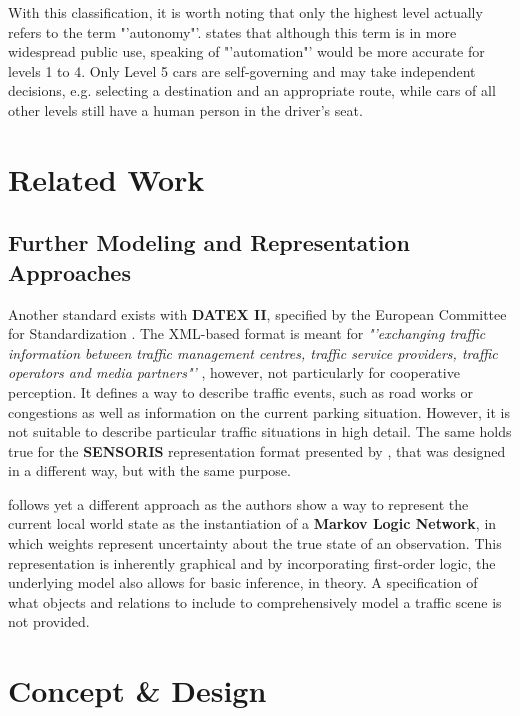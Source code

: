 With this classification, it is worth noting that only the highest level actually refers to the term "'autonomy"'. \cite{wood2012potential} states that although this term is in more widespread public use, speaking of "'automation"' would be more accurate for levels 1 to 4. Only Level 5 cars are self-governing and may take independent decisions, e.g. selecting a destination and an appropriate route, while cars of all other levels still have a human person in the driver's seat.

\section{Related Work}
\label{sec:appendix:texts:related_work}

\subsection{Further Modeling and Representation Approaches}
\label{subsec:appendix:texts:related_work:state_represtation}
Another standard exists with \textbf{DATEX II}, specified by the European Committee for Standardization \cite{Dolger2011}. The XML-based format is meant for \textit{"'exchanging traffic information between traffic management centres, traffic service providers, traffic operators and media partners"'} \cite{wiki:datex2}, however, not particularly for cooperative perception. It defines a way to describe traffic events, such as road works or congestions as well as information on the current parking situation. However, it is not suitable to describe particular traffic situations in high detail. The same holds true for the \textbf{SENSORIS} representation format presented by \cite{Hohm2019}, that was designed in a different way, but with the same purpose.
\par
\medskip

\cite{Stiller2012} follows yet a different approach as the authors show a way to represent the current local world state as the instantiation of a \textbf{Markov Logic Network}, in which weights represent uncertainty about the true state of an observation. This representation is inherently graphical and by incorporating first-order logic, the underlying model also allows for basic inference, in theory. A specification of what objects and relations to include to comprehensively model a traffic scene is not provided.

\section{Concept \& Design}
\label{sec:appendix:texts:concept_design}

